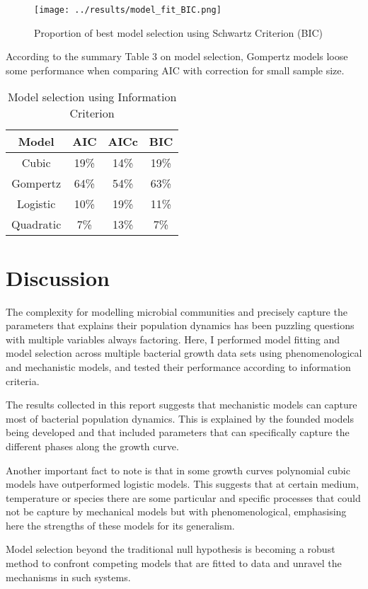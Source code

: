 \documentclass[11]{article}
\begin{document}
\begin{figure}[H]
      \begin{center}
      \texttt{[image: ../results/model\_fit\_BIC.png]}
      \caption{Proportion of best model selection using Schwartz Criterion (BIC)}
      \label{fig:BIC}
      \end{center}
\end{figure}


According to the summary Table 3 on model selection, Gompertz models loose some performance when comparing AIC with correction for small sample size.


\begin{table}[H]
    \caption{Model selection using Information Criterion}
    \centering
    \begin{tabular}{cccc}
    \hline
    Model & AIC  & AICc & BIC\\ 
    \hline
    \hline
     Cubic & 19\% & 14\% & 19\% \\
     Gompertz & 64\% & 54\% & 63\% \\
     Logistic & 10\% & 19\% & 11\% \\
     Quadratic & 7\% & 13\% & 7\%
    \end{tabular}
\end{table}



\section{Discussion}

The complexity for modelling microbial communities and precisely capture the parameters that explains their population dynamics has been puzzling questions with multiple variables always factoring. Here, I performed model fitting and model selection across multiple bacterial growth data sets using phenomenological and mechanistic models, and tested their performance according to information criteria.

The results collected in this report suggests that mechanistic models can capture most of bacterial population dynamics. This is explained by the founded models being developed and that included parameters that can specifically capture the different phases along the growth curve.

Another important fact to note is that in some growth curves polynomial cubic models have outperformed logistic models. This suggests that at certain medium, temperature or species there are some particular and specific processes that could not be capture by mechanical models but with phenomenological, emphasising here the strengths of these models for its generalism.

Model selection beyond the traditional null hypothesis is becoming a robust method to confront competing models that are fitted to data and unravel the mechanisms in such systems.    


    
    
\end{document}

